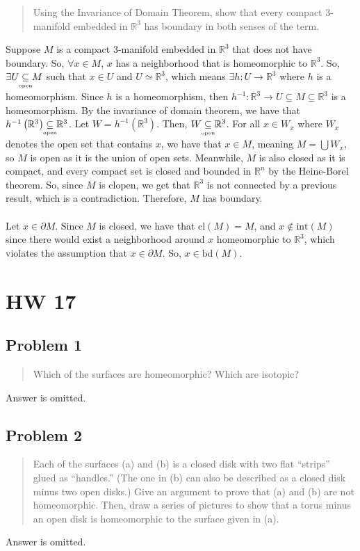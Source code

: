 \documentclass[8pt]{extarticle}
\newcommand{\plain}[1]{\textrm{#1}}
\newcommand{\open}{\underset{\clap{\tiny open}}{\subseteq}}
\begin{document}
{\begin{quote}
	Using the Invariance of Domain Theorem, show that every compact 3-manifold embedded in $\mathbb{R}^3$ has boundary in both senses of the term.
\end{quote}
Suppose $M$ is a compact 3-manifold embedded in $\mathbb{R}^3$ that does not have boundary. So, $\forall x\in M$, $x$ has a neighborhood that is homeomorphic to $\mathbb{R}^3$. So, $\exists U\open M$ such that $x\in U$ and $U\simeq \mathbb{R}^3$, which means $\exists h: U\rightarrow \mathbb{R}^3$ where $h$ is a homeomorphism. Since $h$ is a homeomorphism, then $h^{-1}:\mathbb{R}^3\rightarrow U \subseteq M \subseteq \mathbb{R}^3$ is a homeomorphism. By the invariance of domain theorem, we have that $h^{-1}\left( \mathbb{R}^3\right) \open \mathbb{R}^3$. Let $W = h^{-1}\left(\mathbb{R}^3\right)$. Then, $W\open \mathbb{R}^3$. For all $x\in W_{x}$ where $W_{x}$ denotes the open set that contains $x$, we have that $x\in M$, meaning $M = \bigcup W_{x}$, so $M$ is open as it is the union of open sets. Meanwhile, $M$ is also closed as it is compact, and every compact set is closed and bounded in $\mathbb{R}^n$ by the Heine-Borel theorem. So, since $M$ is clopen, we get that $\mathbb{R}^3$ is not connected by a previous result, which is a contradiction. Therefore, $M$ has boundary.\\
\\
Let $x\in \partial M$. Since $M$ is closed, we have that $\plain{cl}(M) = M$, and $x\not\in \plain{int}(M)$ since there would exist a neighborhood around $x$ homeomorphic to $\mathbb{R}^3$, which violates the assumption that $x\in \partial M$. So, $x\in \plain{bd}(M)$.
\pagebreak
\section*{HW 17}%
\subsection*{Problem 1}%
\begin{quote}
	Which of the surfaces are homeomorphic? Which are isotopic?
\end{quote}
Answer is omitted.
\subsection*{Problem 2}%

\begin{quote}
	Each of the surfaces (a) and (b) is a closed disk with two flat ``strips'' glued as ``handles.'' (The one in (b) can also be described as a closed disk minus two open disks.) Give an argument to prove that (a) and (b) are not homeomorphic. Then, draw a series of pictures to show that a torus minus an open disk is homeomorphic to the surface given in (a).
\end{quote}
Answer is omitted.
}
\end{document}
